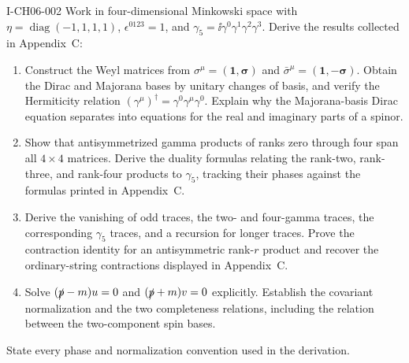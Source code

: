 \begin{exercise}{I-CH06-002}
Work in four-dimensional Minkowski space with
\(\eta=\operatorname{diag}(-1,1,1,1)\), \(\epsilon^{0123}=1\), and
\(\gamma_5=\ii\gamma^0\gamma^1\gamma^2\gamma^3\).  Derive the results
collected in Appendix~C:
\begin{enumerate}[label=(\alph*)]
 \item Construct the Weyl matrices from
 \(\sigma^\mu=(\mathbf1,\boldsymbol\sigma)\) and
 \(\bar\sigma^\mu=(\mathbf1,-\boldsymbol\sigma)\).  Obtain the Dirac and
 Majorana bases by unitary changes of basis, and verify the Hermiticity
 relation \((\gamma^\mu)^\dagger=\gamma^0\gamma^\mu\gamma^0\).  Explain
 why the Majorana-basis Dirac equation separates into equations for the
 real and imaginary parts of a spinor.
 \item Show that antisymmetrized gamma products of ranks zero through four
 span all \(4\times4\) matrices.  Derive the duality formulas relating the
 rank-two, rank-three, and rank-four products to \(\gamma_5\), tracking
 their phases against the formulas printed in Appendix~C.
 \item Derive the vanishing of odd traces, the two- and four-gamma traces,
 the corresponding \(\gamma_5\) traces, and a recursion for longer traces.
 Prove the contraction identity for an antisymmetric rank-\(r\) product
 and recover the ordinary-string contractions displayed in Appendix~C.
 \item Solve \((\slashed p-m)u=0\) and \((\slashed p+m)v=0\) explicitly.
 Establish the covariant normalization and the two completeness relations,
 including the relation between the two-component spin bases.
\end{enumerate}
State every phase and normalization convention used in the derivation.
\end{exercise}
